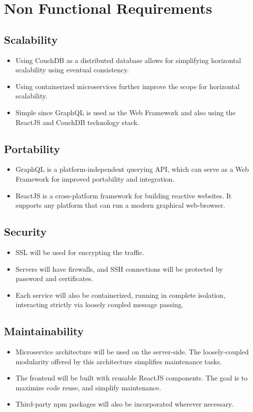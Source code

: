 \section{Non Functional Requirements}

\subsection{Scalability}
\begin{itemize}
    \item Using CouchDB as a distributed database allows for simplifying 
    horizontal scalability using eventual consistency.
    \item Using containerized microservices further improve the scope for horizontal scalability.
    \item Simple since GraphQL is used as the Web Framework 
    and also using the ReactJS and CouchDB technology stack.
\end{itemize}

\subsection{Portability}
\begin{itemize}
    \item GraphQL is a platform-independent querying API, 
    which can serve as a Web Framework for improved portability and integration.
    \item ReactJS is a cross-platform framework for building reactive websites. 
    It supports any platform that can run a modern graphical web-browser.
\end{itemize}

\subsection{Security}
\begin{itemize}
    \item SSL will be used for encrypting the traffic.
    \item Servers will have firewalls, and SSH connections will be protected by password and certificates.
    \item Each service will also be containerized, running in complete isolation, interacting strictly via 
    loosely coupled message passing.
\end{itemize}

\subsection{Maintainability}
\begin{itemize}
    \item Microservice architecture will be used on the server-side. 
    The loosely-coupled modularity offered by this architecture simplifies maintenance tasks.
    \item The frontend will be built with reusable ReactJS components. 
    The goal is to maximize code reuse, and simplify maintenance.
    \item Third-party npm packages will also be incorporated wherever necessary.
\end{itemize}

